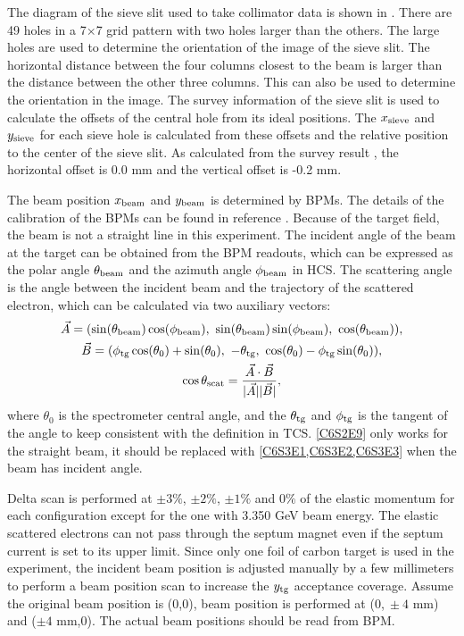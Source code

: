 The diagram of the sieve slit used to take collimator data is shown in . There are 49 holes in a 7$\times$7 grid pattern with two holes larger than the others. The large holes are used to determine the orientation of the image of the sieve slit. The horizontal distance between the four columns closest to the beam is larger than the distance between the other three columns. This can also be used to determine the orientation in the image. The survey information of the sieve slit is used to calculate the offsets of the central hole from its ideal positions. The $x_{\mathrm{sieve}}$ and $y_{\mathrm{sieve}}$ for each sieve hole is calculated from these offsets and the relative position to the center of the sieve slit. As calculated from the survey result \cite{SurveyA1453,SurveyA1465}, the horizontal offset is 0.0 mm and the vertical offset is -0.2 mm.

The beam position $x_{\mathrm{beam}}$ and $y_{\mathrm{beam}}$ is determined by BPMs. The details of the calibration of the BPMs can be found in reference \cite{Zhu2016}. Because of the target field, the beam is not a straight line in this experiment. The incident angle of the beam at the target can be obtained from the BPM readouts, which can be expressed as the polar angle $\theta_{\mathrm{beam}}$ and the azimuth angle $\phi_{\mathrm{beam}}$ in HCS. The scattering angle is the angle between the incident beam and the trajectory of the scattered electron, which can be calculated via two auxiliary vectors:
\begin{gather} \label{C6S3E1}
\vec{A} = (\sin(\optt{beam})\cos(\optp{beam}),\ \sin(\optt{beam})\sin(\optp{beam}),\ \cos(\optt{beam})), \\ \label{C6S3E2}
\vec{B} = (\optp{tg}\cos(\theta_0)+\sin(\theta_0),\ -\optt{tg},\ \cos(\theta_0)-\optp{tg}\sin(\theta_0)), \\ \label{C6S3E3}
\cos\optt{scat} = \frac{\vec{A}\cdot\vec{B}}{|\vec{A}||\vec{B}|},
\end{gather}
where $\theta_0$ is the spectrometer central angle, and the $\theta_{\mathrm{tg}}$ and $\phi_{\mathrm{tg}}$ is the tangent of the angle to keep consistent with the definition in TCS. \cref{C6S2E9} only works for the straight beam, it should be replaced with \cref{C6S3E1,C6S3E2,C6S3E3} when the beam has incident angle.

Delta scan is performed at $\pm 3\%$, $\pm 2\%$, $\pm 1\%$ and $0\%$ of the elastic momentum for each configuration except for the one with 3.350 GeV beam energy. The elastic scattered electrons can not pass through the septum magnet even if the septum current is set to its upper limit. Since only one foil of carbon target is used in the experiment, the incident beam position is adjusted manually by a few millimeters to perform a beam position scan to increase the $y_{\mathrm{tg}}$ acceptance coverage. Assume the original beam position is (0,0), beam position is performed at (0,$\ \pm 4$ mm) and ($\pm 4$ mm,0). The actual beam positions should be read from BPM.

